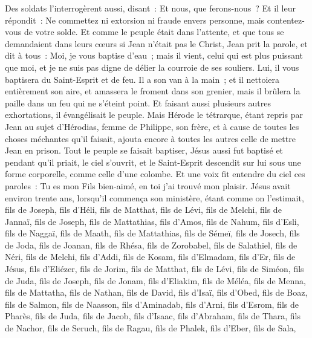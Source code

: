 \begin{multicols}{2}
Des soldats l'interrogèrent aussi, disant~: Et nous, que ferons-nous~? Et il leur répondit~: Ne commettez ni extorsion ni fraude envers personne, mais contentez-vous de votre solde.
Et comme le peuple était dans l'attente, et que tous se demandaient dans leurs cœurs si Jean n'était pas le Christ,
Jean prit la parole, et dit à tous~: Moi, je vous baptise d'eau~; mais il vient, celui qui est plus puissant que moi, et je ne suis pas digne de délier la courroie de ses souliers. Lui, il vous baptisera du Saint-Esprit et de feu.
Il a son van à la main~; et il nettoiera entièrement son aire, et amassera le froment dans son grenier, mais il brûlera la paille dans un feu qui ne s'éteint point.
Et faisant aussi plusieurs autres exhortations, il évangélisait le peuple.
Mais Hérode le tétrarque, étant repris par Jean au sujet d'Hérodias, femme de Philippe, son frère, et à cause de toutes les choses méchantes qu'il faisait,
ajouta encore à toutes les autres celle de mettre Jean en prison.
Tout le peuple se faisait baptiser, Jésus aussi fut baptisé et pendant qu'il priait, le ciel s'ouvrit,
et le Saint-Esprit descendit sur lui sous une forme corporelle, comme celle d'une colombe. Et une voix fit entendre du ciel ces paroles~: Tu es mon Fils bien-aimé, en toi j'ai trouvé mon plaisir.
Jésus avait environ trente ans, lorsqu'il commença son ministère, étant comme on l'estimait, fils de Joseph, fils d'Héli,
fils de Matthat, fils de Lévi, fils de Melchi, fils de Jannaï, fils de Joseph,
fils de Mattathias, fils d'Amos, fils de Nahum, fils d'Esli, fils de Naggaï,
fils de Maath, fils de Mattathias, fils de Sémeï, fils de Josech, fils de Joda,
fils de Joanan, fils de Rhésa, fils de Zorobabel, fils de Salathiel, fils de Néri,
fils de Melchi, fils d'Addi, fils de Kosam, fils d'Elmadam, fils d'Er,
fils de Jésus, fils d'Eliézer, fils de Jorim, fils de Matthat, fils de Lévi,
fils de Siméon, fils de Juda, fils de Joseph, fils de Jonam, fils d'Eliakim,
fils de Méléa, fils de Menna, fils de Mattatha, fils de Nathan, fils de David,
fils d'Isaï, fils d'Obed, fils de Boaz, fils de Salmon, fils de Naasson,
fils d'Aminadab, fils d'Arni, fils d'Esrom, fils de Pharès, fils de Juda,
fils de Jacob, fils d'Isaac, fils d'Abraham, fils de Thara, fils de Nachor,
fils de Seruch, fils de Ragau, fils de Phalek, fils d'Eber, fils de Sala,

\end{multicols}
